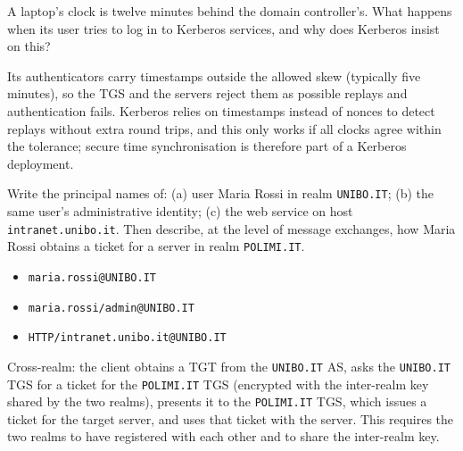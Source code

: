 \begin{exercise}
A laptop's clock is twelve minutes behind the domain controller's. What happens when its user tries to log in to Kerberos services, and why does Kerberos insist on this?
\end{exercise}
\begin{solution}
Its authenticators carry timestamps outside the allowed skew (typically five minutes), so the TGS and the servers reject them as possible replays and authentication fails. Kerberos relies on timestamps instead of nonces to detect replays without extra round trips, and this only works if all clocks agree within the tolerance; secure time synchronisation is therefore part of a Kerberos deployment.
\end{solution}

\begin{exercise}
Write the principal names of: (a) user Maria Rossi in realm \texttt{UNIBO.IT}; (b) the same user's administrative identity; (c) the web service on host \texttt{intranet.unibo.it}. Then describe, at the level of message exchanges, how Maria Rossi obtains a ticket for a server in realm \texttt{POLIMI.IT}.
\end{exercise}
\begin{solution}
\begin{itemize}
    \item[(a)] \texttt{maria.rossi@UNIBO.IT}
    \item[(b)] \texttt{maria.rossi/admin@UNIBO.IT}
    \item[(c)] \texttt{HTTP/intranet.unibo.it@UNIBO.IT}
\end{itemize}
Cross-realm: the client obtains a TGT from the \texttt{UNIBO.IT} AS, asks the \texttt{UNIBO.IT} TGS for a ticket for the \texttt{POLIMI.IT} TGS (encrypted with the inter-realm key shared by the two realms), presents it to the \texttt{POLIMI.IT} TGS, which issues a ticket for the target server, and uses that ticket with the server. This requires the two realms to have registered with each other and to share the inter-realm key.
\end{solution}

